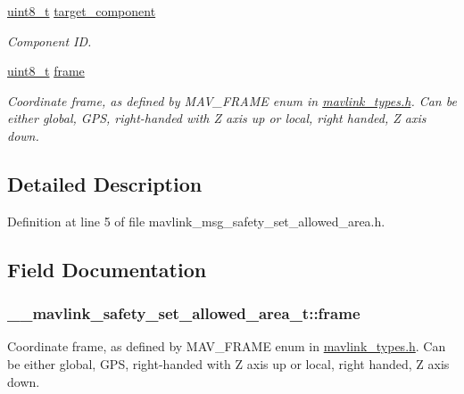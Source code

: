 \begin{DoxyCompactItemize}
\hyperlink{stdint_8h_aba7bc1797add20fe3efdf37ced1182c5}{uint8\-\_\-t} \hyperlink{struct____mavlink__safety__set__allowed__area__t_a4aea287fa77793e6c8c00b5b4f059aa9}{target\-\_\-component}
\begin{DoxyCompactList}\small\item\em Component I\-D. \end{DoxyCompactList}\item 
\hyperlink{stdint_8h_aba7bc1797add20fe3efdf37ced1182c5}{uint8\-\_\-t} \hyperlink{struct____mavlink__safety__set__allowed__area__t_a52d592378bcb6ba92e9eb412bd12b46b}{frame}
\begin{DoxyCompactList}\small\item\em Coordinate frame, as defined by M\-A\-V\-\_\-\-F\-R\-A\-M\-E enum in \hyperlink{mavlink__types_8h}{mavlink\-\_\-types.\-h}. Can be either global, G\-P\-S, right-\/handed with Z axis up or local, right handed, Z axis down. \end{DoxyCompactList}\end{DoxyCompactItemize}


\subsection{Detailed Description}


Definition at line 5 of file mavlink\-\_\-msg\-\_\-safety\-\_\-set\-\_\-allowed\-\_\-area.\-h.



\subsection{Field Documentation}
\hypertarget{struct____mavlink__safety__set__allowed__area__t_a52d592378bcb6ba92e9eb412bd12b46b}{
\subsubsection[{frame}]{ \-\_\-\-\_\-mavlink\-\_\-safety\-\_\-set\-\_\-allowed\-\_\-area\-\_\-t\-::frame}}\label{struct____mavlink__safety__set__allowed__area__t_a52d592378bcb6ba92e9eb412bd12b46b}


Coordinate frame, as defined by M\-A\-V\-\_\-\-F\-R\-A\-M\-E enum in \hyperlink{mavlink__types_8h}{mavlink\-\_\-types.\-h}. Can be either global, G\-P\-S, right-\/handed with Z axis up or local, right handed, Z axis down. 



